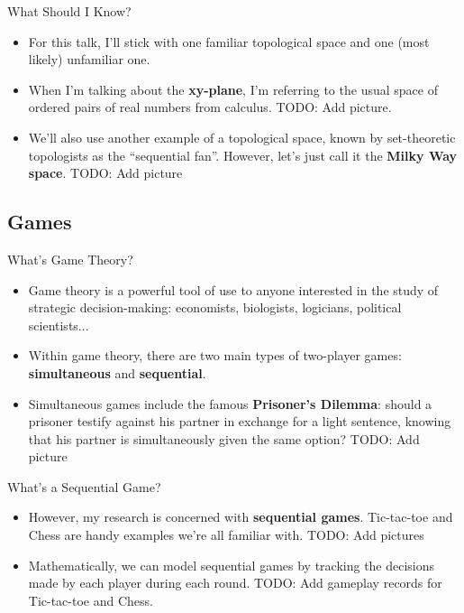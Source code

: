 \documentclass{beamer}
\begin{document}
\begin{frame}{What Should I Know?}
  \begin{itemize}
  \item
    For this talk, I'll stick with one familiar topological space and one (most likely) unfamiliar one.
  \pause
  \item
    When I'm talking about the \textbf{xy-plane}, I'm referring to the usual space of ordered pairs of real numbers from calculus. TODO: Add picture.
  \pause
  \item
    We'll also use another example of a topological space, known by set-theoretic topologists as the ``sequential fan''. However, let's just call it the \textbf{Milky Way space}. TODO: Add picture
  \end{itemize}
\end{frame}

\subsection{Games}

\begin{frame}{What's Game Theory?}

  \begin{itemize}
  \item
    Game theory is a powerful tool of use to anyone interested in the study of strategic decision-making: economists, biologists, logicians, political scientists...
  \pause
  \item
    Within game theory, there are two main types of two-player games: \textbf{simultaneous} and \textbf{sequential}.
  \pause
  \item
    Simultaneous games include the famous \textbf{Prisoner's Dilemma}: should a prisoner testify against his partner in exchange for a light sentence, knowing that his partner is simultaneously given the same option? TODO: Add picture
  \end{itemize}

\end{frame}

\begin{frame}{What's a Sequential Game?}
  \begin{itemize}
  \item
    However, my research is concerned with \textbf{sequential games}. Tic-tac-toe and Chess are handy examples we're all familiar with. TODO: Add pictures
  \pause
  \item
    Mathematically, we can model sequential games by tracking the decisions made by each player during each round. TODO: Add gameplay records for Tic-tac-toe and Chess.
  \end{itemize}
\end{frame}
\end{document}
